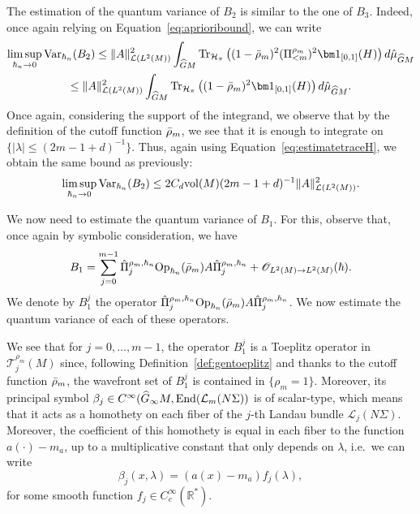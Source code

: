 \documentclass[12pt,a4paper]{amsart}
\theoremstyle{plain}
\theoremstyle{definition}
\theoremstyle{remark}
\numberwithin{equation}{section}
\theoremstyle{definition}
\def\R{{\mathbb R}}%
\def \Op{{\rm Op}}
\def \O{\mathscr{O}}
\def \Ghat{\widehat{G}}
\numberwithin{equation}{section}
\begin{document}
\vspace{0.25cm}

The estimation of the quantum variance of $B_2$ is similar to the one of $B_3$. Indeed, once again relying on Equation~\eqref{eq:aprioribound}, we can write
\begin{multline*}
    \limsup_{\hbar_n\rightarrow 0}{\rm Var}_{\hbar_n}(B_2)
    \leq \|A\|_{\mathcal{L}(L^2(M))}^2\int_{\Ghat M} {\rm Tr}_{\mathcal{H}_\pi}\left((1-\Bar{\rho}_m)^2(\Pi_{<m}^{\rho_m})^2{\bm 1}_{[0,1]}(H)\right)d\hat{\mu}_{\Ghat M}\\
    \leq \|A\|_{\mathcal{L}(L^2(M))}^2\int_{\Ghat M} {\rm Tr}_{\mathcal{H}_\pi}\left((1-\Bar{\rho}_m)^2{\bm 1}_{[0,1]}(H)\right)d\hat{\mu}_{\Ghat M}.
\end{multline*}
Once again, considering the support of the integrand, we observe that by the definition of the cutoff function $\Bar{\rho}_m$, we see that it is enough to integrate on $\{|\lambda|\leq (2m-1+d)^{-1}\}$. Thus, again using Equation~\eqref{eq:estimatetraceH}, we obtain the same bound as previously:
\begin{equation}
    \label{eq:estimateB2}
    \limsup_{\hbar_n\rightarrow 0}{\rm Var}_{\hbar_n}(B_2)
    \leq  2C_d{\rm vol}(M)(2m-1+d)^{-1} \|A\|_{\mathcal{L}(L^2(M))}^2.
\end{equation}

\vspace{0.25cm}
    
We now need to estimate the quantum variance of $B_1$. For this, observe that, once again by symbolic consideration, we have
\begin{equation*}
    B_1 = \sum_{j=0}^{m-1}\hat{\Pi}_j^{\rho_m,\hbar_n} \Op_{\hbar_n}(\Bar{\rho}_m)A \hat{\Pi}_j^{\rho_m,\hbar_n} + \O_{L^2(M)\rightarrow L^2(M)}(\hbar).
\end{equation*}
We denote by $B_1^j$ the operator $\hat{\Pi}_j^{\rho_m,\hbar_n} \Op_{\hbar_n}(\Bar{\rho}_m) A \hat{\Pi}_j^{\rho_m,\hbar_n}$. We now estimate the quantum variance of each of these operators.

We see that for $j= 0,\dots,m-1$, the operator $B_1^j$ is a Toeplitz operator in $\mathcal{T}_j^{\rho_m}(M)$ since, following Definition~\ref{def:gentoeplitz} and thanks to the cutoff function $\Bar{\rho}_m$, the wavefront set of $B_1^j$ is contained in $\{\rho_m = 1\}$. Moreover, its principal symbol $\beta_j\in C^\infty(\Ghat_\infty M, {\rm End}(\mathcal{L}_m(N\Sigma))$ is of scalar-type, which means that it acts as a homothety on each fiber of the $j$-th Landau bundle $\mathcal{L}_j(N\Sigma)$. Moreover, the coefficient of this homothety is equal in each fiber to the function $a(\cdot)-m_a$, up to a multiplicative constant that only depends on $\lambda$, i.e.~we can write
\begin{equation}
    \label{eq:formulebetaj}
    \beta_j(x,\lambda) = (a(x)-m_a)f_j(\lambda),
\end{equation}
for some smooth function $f_j\in C_c^\infty(\R^*)$.
    
\end{document}
